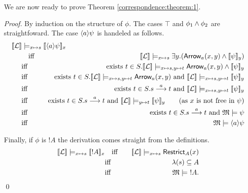 \NI We are now ready to prove Theorem \ref{correspondence:theorem:1}.
\begin{proof}
By induction on the structure of $\phi$. The cases $\top$ and $\phi_1
\land \phi_2$ are straightfoward.  The case $\langle a \rangle \psi$ is handeled
as follows.
\begin{eqnarray*}
  \lefteqn{
  \SEMB{\LLL} \models_{x \mapsto s} \SEMB{\MAY{a}\psi}_x}\hspace{5mm} 
     \\
     &\quad \text{iff}\quad &
  \SEMB{\LLL} \models_{x \mapsto s} \exists y.(\ARROW{a}{x}{y} \AND \SEMB{\psi}_y) 
     \\
     &\text{iff}&
  \text{exists}\ t \in S. \SEMB{\LLL} \models_{x \mapsto s, y \mapsto t} \ARROW{a}{x}{y} \AND \SEMB{\psi}_y
     \\
     &\text{iff}&
  \text{exists}\ t \in S. \SEMB{\LLL} \models_{x \mapsto s, y \mapsto t} \ARROW{a}{x}{y} \ \text{and}\ \SEMB{\LLL} \models_{x \mapsto s, y \mapsto t}  \SEMB{\psi}_y
     \\
     &\text{iff}&
  \text{exists}\ t \in S. s \TRANS{a} t \ \text{and}\ \SEMB{\LLL} \models_{x \mapsto s, y \mapsto t}  \SEMB{\psi}_y
     \\
     &\text{iff}&
  \text{exists}\ t \in S. s \TRANS{a} t \ \text{and}\ \SEMB{\LLL} \models_{y \mapsto t}  \SEMB{\psi}_y \qquad (\text{as $x$ is not free in $\psi$})
     \\
     &\text{iff}&
  \text{exists}\ t \in S. s \TRANS{a} t \ \text{and}\ \MMM \models \psi
     \\
     &\text{iff}&
  \MMM \models \MAY{a}\psi  
\end{eqnarray*}

\NI Finally, if $\phi$ is $!A$ the derivation comes straight from the
definitions.
\begin{eqnarray*}
  \lbrack\!\lbrack \mathcal{L} \rbrack\!\rbrack \models_{x \mapsto s} \lbrack\!\lbrack !A \rbrack\!\rbrack_x
    &\quad \text{iff}\quad &
  \lbrack\!\lbrack \mathcal{L} \rbrack\!\rbrack \models_{x \mapsto s} \mathsf{Restrict}_{A}(x)
     \\
     &\text{iff}&
  \lambda(s) \subseteq A
     \\
     &\text{iff}&
  \frak{M} \models\ !A.
\end{eqnarray*}
\qed
\end{proof}


